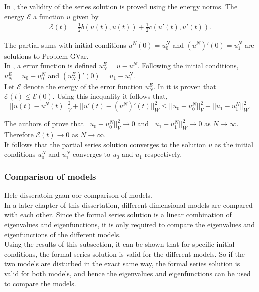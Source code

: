 \documentclass[../../main.tex]{subfiles}
\begin{document}
In \cite{CVV18}, the validity of the series solution is proved using the energy norms. The energy $\mathcal{E}$ a function $u$ given by
\begin{eqnarray}
	\mathcal{E} (t) = \frac{1}{2} b(u(t), u(t)) + \frac{1}{2} c(u'(t), u'(t)). \label{eq:1D_Model:ModalAnalysisEnergy}
\end{eqnarray}

The partial sums with initial conditions $u^N(0) = u^N_0$ and $(u^N)'(0) = u^N_1$ are solutions to Problem GVar.\\

In \cite{CVV18}, a error function is defined $u^E_N = u - u^N$. Following the initial conditions, $u^E_N = u_0 - u^N_0$ and $(u^E_N)'(0) = u_1 - u^N_1$.\\

Let $\mathcal{E}$ denote the energy of the error function $u^E_N$. In \cite{CVV18} it is proven that $\mathcal{E}(t) \leq \mathcal{E}(0)$. Using this inequality it follows that, \[||u(t) -  u^N(t)||_V^2 + ||u'(t) - (u^N)'(t)||^2_W \leq ||u_0 - u^N_0||_V^2 + ||u_1 - u^N_1||_W^2. \]

The authors of \cite{CVV18} prove that $||u_0 - u^N_0||_V^2 \rightarrow 0$ and $||u_1 - u^N_1||_W^2 \rightarrow 0$ as $N \rightarrow \infty$. Therefore $\mathcal{E}(t) \rightarrow 0$ as $N \rightarrow \infty$.\\

It follows that the partial series solution converges to the solution $u$ as the initial conditions $u_0^N$ and $u_1^N$ converges to $u_0$ and $u_1$ respectively.\\


\subsubsection{Comparison of models}
Hele disseratoin gaan oor comparison of models. \\


In a later chapter of this dissertation, different dimensional models are compared with each other. Since the formal series solution is a linear combination of eigenvalues and eigenfunctions, it is only required to compare the eigenvalues and eigenfunctions of the different models.\\

Using the results of this subsection, it can be shown that for specific initial conditions, the formal series solution is valid for the different models. So if the two models are disturbed in the exact same way, the formal series solution is valid for both models, and hence the eigenvalues and eigenfunctions can be used to compare the models.\\
\end{document}
